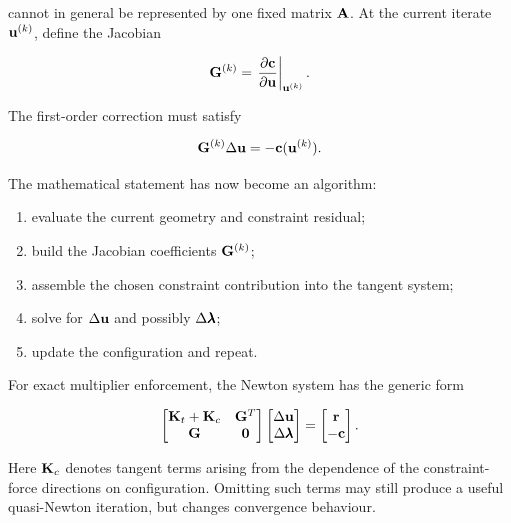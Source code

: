 cannot in general be represented by one fixed matrix $\mathbf{A}$. At the current
iterate $\mathbf{u}^{(k)}$, define the Jacobian

\begin{equation}
    \mathbf{G}^{(k)}=
    \left.
    \frac{\partial\mathbf{c}}{\partial\mathbf{u}}
    \right|_{\mathbf{u}^{(k)}}.
\end{equation}

The first-order correction must satisfy

\begin{equation}\label{mfc-nonlinear-linearization}
    \mathbf{G}^{(k)}\Delta\mathbf{u}
    =-\mathbf{c}(\mathbf{u}^{(k)}).
\end{equation}

The mathematical statement has now become an algorithm:

\begin{enumerate}
    \item evaluate the current geometry and constraint residual;
    \item build the Jacobian coefficients $\mathbf{G}^{(k)}$;
    \item assemble the chosen constraint contribution into the tangent system;
    \item solve for $\Delta\mathbf{u}$ and possibly $\Delta\pmb{\lambda}$;
    \item update the configuration and repeat.
\end{enumerate}

For exact multiplier enforcement, the Newton system has the generic form

\begin{equation}\label{mfc-nonlinear-lagrange-system}
    \begin{bmatrix}
        \mathbf{K}_t+\mathbf{K}_c & \mathbf{G}^T\\
        \mathbf{G} & \mathbf{0}
    \end{bmatrix}
    \begin{bmatrix}
        \Delta\mathbf{u}\\
        \Delta\pmb{\lambda}
    \end{bmatrix}
    =
    \begin{bmatrix}
        \mathbf{r}\\
        -\mathbf{c}
    \end{bmatrix}.
\end{equation}

Here $\mathbf{K}_c$ denotes tangent terms arising from the dependence of the
constraint-force directions on configuration. Omitting such terms may still
produce a useful quasi-Newton iteration, but changes convergence behaviour.

